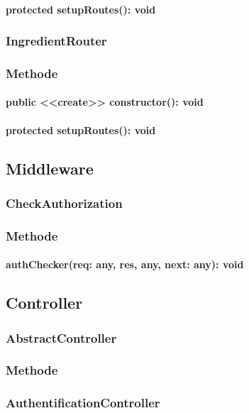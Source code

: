 \documentclass[parskip=full]{scrartcl}
\begin{document}
\paragraph{protected setupRoutes(): void}

\subsubsection{IngredientRouter}
\subsubsection*{Methode}
\paragraph{public <<create>> constructor(): void}
\paragraph{protected setupRoutes(): void}

\subsection{Middleware}
\subsubsection{CheckAuthorization}
\subsubsection*{Methode}
\paragraph{authChecker(req: any, res, any, next: any): void}

\subsection{Controller}
\subsubsection{AbstractController}
\subsubsection*{Methode}


\subsubsection{AuthentificationController}
\end{document}
